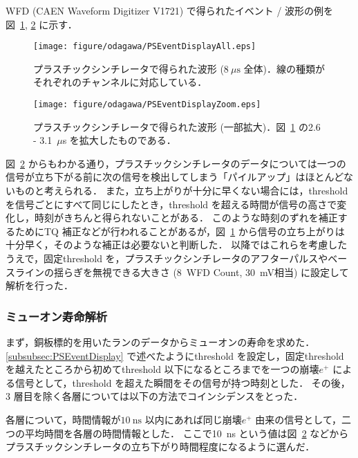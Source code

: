 WFD (CAEN Waveform Digitizer V1721) で得られたイベント / 波形の例を図~\ref{fig:PSEventDisplayAll}, \ref{fig:PSEventDisplayZoom} に示す．
\begin{figure}[h]
	\centering
	\texttt{[image: figure/odagawa/PSEventDisplayAll.eps]}
	\caption{プラスチックシンチレータで得られた波形 ($8~\mu\mathrm{s}$ 全体)．線の種類がそれぞれのチャンネルに対応している．}
	\label{fig:PSEventDisplayAll}
\end{figure}%
\begin{figure}[h]
	\centering
	\texttt{[image: figure/odagawa/PSEventDisplayZoom.eps]}
	\caption{プラスチックシンチレータで得られた波形 (一部拡大)．図~\ref{fig:PSEventDisplayAll} の2.6 - 3.1~$\mu$s を拡大したものである．}
	\label{fig:PSEventDisplayZoom}
\end{figure}%
図~\ref{fig:PSEventDisplayZoom} からもわかる通り，プラスチックシンチレータのデータについては一つの信号が立ち下がる前に次の信号を検出してしまう「パイルアップ」はほとんどないものと考えられる．
また，立ち上がりが十分に早くない場合には，threshold を信号ごとにすべて同じにしたとき，threshold を超える時間が信号の高さで変化し，時刻がきちんと得られないことがある．
このような時刻のずれを補正するためにTQ 補正などが行われることがあるが，図~\ref{fig:PSEventDisplayAll} から信号の立ち上がりは十分早く，そのような補正は必要ないと判断した．
以降ではこれらを考慮したうえで，固定threshold を，プラスチックシンチレータのアフターパルスやベースラインの揺らぎを無視できる大きさ (8~WFD Count, 30~mV相当) に設定して解析を行った．

\subsubsection{ミューオン寿命解析}
\label{subsubsec:PSLife}

まず，銅板標的を用いたランのデータからミューオンの寿命を求めた．
\ref{subsubsec:PSEventDisplay} で述べたようにthreshold を設定し，固定threshold を越えたところから初めてthreshold 以下になるところまでを一つの崩壊$e^{+}$ による信号として，threshold を超えた瞬間をその信号が持つ時刻とした．
その後，3 層目を除く各層については以下の方法でコインシデンスをとった．

各層について，時間情報が$10~\mathrm{ns}$ 以内にあれば同じ崩壊$e^{+}$ 由来の信号として，二つの平均時間を各層の時間情報とした．
ここで10~ns という値は図~\ref{fig:PSEventDisplayZoom} などからプラスチックシンチレータの立ち下がり時間程度になるように選んだ．

